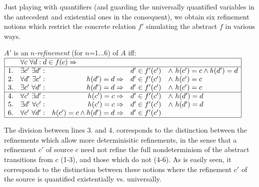 Just playing with quantifiers (and guarding the universally quantified
variables in the antecedent and existential ones in the consequent), we
obtain six refinement notions which restrict the concrete relation $f'$
simulating the abstract $f$ in various ways.
\begin{DEFINITION}{}\label{de:ref}
 $A'$ is an {\em $n$-refinement} (for $n$=1...6) of $A$ iff:\\[1ex]
\hspace*{4em} $\begin{array}{|rrrcl|}
\hline
& \multicolumn{4}{l|}{\forall c\ \forall d : d\in f(c) \impl}\\
\hline
1. &\exists c'\ \exists d' :& & d'\in f'(c') & \land\ h(c')=c \land h(d')=d\\
2. & \forall d'\ \exists c' : & h(d')=d \impl & d'\in f'(c')
&  \land\ h(c')=c \\
3. & \exists c'\ \forall d' : & h(d')=d \impl & d'\in f'(c') &
 \land\ h(c')=c \\
\hline
4. & \forall c'\ \exists d' :& h(c')=c \impl & d' \in f'(c')
   &  \land\ h(d')=d\\
5. & \exists d'\ \forall c' : & h(c')=c \impl & d'\in f'(c')
   &  \land\ h(d')=d \\
6. & \forall c'\ \forall d' : &  h(c')=c \land h(d')=d \impl & d'\in f'(c') & \\
\hline
\end{array}$
\end{DEFINITION}
\noindent
The division between lines 3. and 4. corresponds to the distinction between
the refinements which allow more determinisitic refinements, in the sense
that a refinement $c'$ of source $c$ need not refine the full nondeterminism
of the abstract transitions from $c$ (1-3), and those which do not (4-6).
As is easily seen, it corresponds to the distinction between these
notions where the refinement $c'$ of the source  is quantified existentially
vs. universally.

